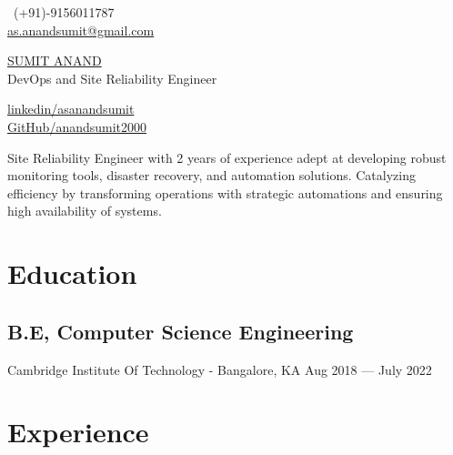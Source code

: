 \documentclass[a4,10pt]{article}
\begin{document}
\begin{center}
    \begin{minipage}[b]{0.24\textwidth}
            \ (+91)-9156011787 \\
            \normalsize \href{mailto:as.anandsumit@gmail.com}{as.anandsumit@gmail.com} 
    \end{minipage}%
    \begin{minipage}[b]{0.5\textwidth}
            \centering
            {\Huge \underline {SUMIT ANAND}} \\ %
            \vspace{0.1cm}
            {\color{UI_blue} \Large{DevOps and Site Reliability Engineer}} \\
    \end{minipage}%
    \begin{minipage}[b]{0.24\textwidth}
            \flushright \normalsize  %
            {\href{https://www.linkedin.com/in/asanandsumit/}{linkedin/asanandsumit} } \\
            \href{https://github.com/anandsumit2000}{GitHub/anandsumit2000}
    \end{minipage}   

    {\color{UI_blue} \hrulefill}
\end{center}

Site Reliability Engineer with 2 years of experience adept at developing robust monitoring tools, disaster recovery, and automation solutions. Catalyzing efficiency by transforming operations with strategic automations and ensuring high availability of systems.  %

\section{Education }

\subsection*{B.E, Computer Science Engineering} 
{{\normalsize \normalfont Cambridge Institute Of Technology - Bangalore, KA} \hfill Aug 2018 --- July 2022} 

\section{Experience}

\end{document}
